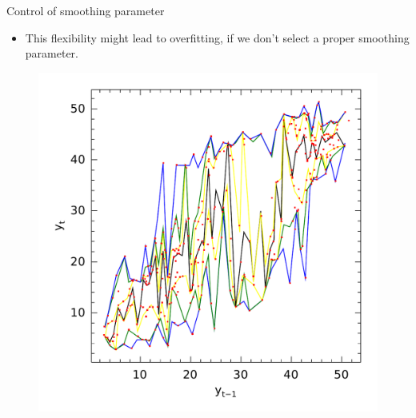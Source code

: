 \documentclass[11pt]{beamer}
\begin{document}
\begin{frame}{Control of smoothing parameter}

\begin{itemize}

\item
This flexibility might lead to overfitting, if we don't select a
proper smoothing parameter.
\end{itemize}

\begin{figure}
\centering
\begin{minipage}[t]{\linewidth}
\centering
\begin{minipage}[t]{0.45\linewidth}
\centering     \includegraphics[width=\textwidth]{../Figuras/npqar/icaraizinho-crossing-01}
\end{minipage}
\begin{minipage}[t]{0.45\linewidth}

\end{minipage}
\end{minipage}
\end{figure}
\end{frame}
\end{document}
